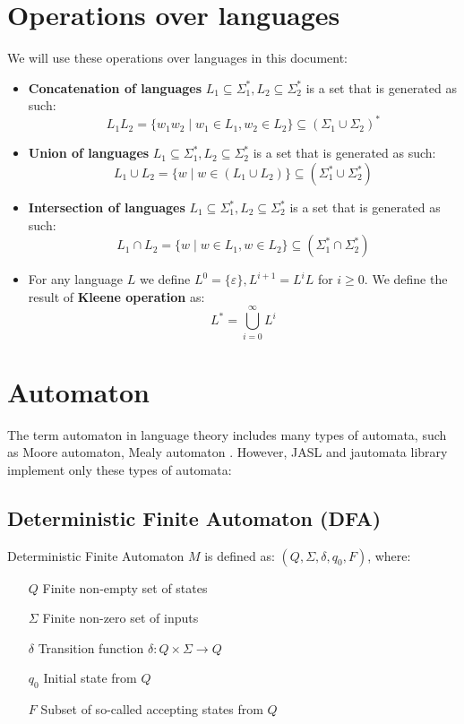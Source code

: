 \documentclass{ctuthesis}
\begin{document}
\section{Operations over languages}
We will use these operations over languages in this document:
\begin{itemize}
	\item \textbf{Concatenation of languages} $L_1 \subseteq \Sigma^*_1, L_2 \subseteq \Sigma^*_2$ is a set that is generated as such:
	\begin{equation*}
		L_1L_2 = \{w_1w_2 \mid w_1 \in L_1, w_2 \in L_2\} \subseteq (\Sigma_1 \cup \Sigma_2)^*
	\end{equation*}
	
	\item \textbf{Union of languages} $L_1 \subseteq \Sigma^*_1, L_2 \subseteq \Sigma^*_2$ is a set that is generated as such:
	\begin{equation*}
		L_1\cup L_2 = \{w \mid w \in (L_1 \cup L_2) \} \subseteq (\Sigma_1^* \cup \Sigma_2^*)
	\end{equation*}
	
	\item \textbf{Intersection of languages} $L_1 \subseteq \Sigma^*_1, L_2 \subseteq \Sigma^*_2$ is a set that is generated as such:
	\begin{equation*}
		L_1 \cap L_2 = \{w \mid w \in L_1, w \in L_2 \} \subseteq (\Sigma^*_1 \cap \Sigma^*_2)
	\end{equation*}
	
	\item For any language $L$ we define $L^0 = \{\varepsilon\}, L^{i+1} = L^iL$ for $i \geq 0$. We define the result of \textbf{Kleene operation} as:
	\begin{equation*}
		L^* = \bigcup^{\infty}_{i=0} L^i
	\end{equation*}
\end{itemize}

\section{Automaton}
The term automaton in language theory includes many types of automata, such as Moore automaton, Mealy automaton \cite{moore-mealy}. However, JASL and jautomata library implement only these types of automata:
\subsection{Deterministic Finite Automaton (DFA)}
Deterministic Finite Automaton $M$ is defined as: $(Q, \Sigma, \delta, q_0, F)$, where:
\begin{itemize}
	\item[$Q$] Finite non-empty set of states
	\item[$\Sigma$] Finite non-zero set of inputs
	\item[$\delta$] Transition function $\delta : Q \times \Sigma \rightarrow Q$
	\item[$q_0$] Initial state from $Q$
	\item[$F$] Subset of so-called accepting states from $Q$
\end{itemize}
\end{document}
